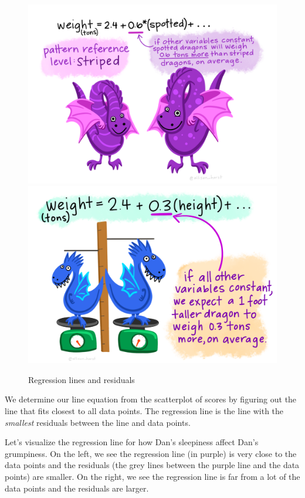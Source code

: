 \documentclass[
]{book}
\begin{document}
\begin{figure}

{\centering \includegraphics[width=0.49\linewidth]{images/13-regression/dragon_categorical} \includegraphics[width=0.49\linewidth]{images/13-regression/dragons_continuous} 

}

\caption{Regression lines and residuals}\label{fig:unnamed-chunk-1}
\end{figure}

We determine our line equation from the scatterplot of scores by figuring out the line that fits closest to all data points. The regression line is the line with the \emph{smallest} residuals between the line and data points.

Let's visualize the regression line for how Dan's sleepiness affect Dan's grumpiness. On the left, we see the regression line (in purple) is very close to the data points and the residuals (the grey lines between the purple line and the data points) are smaller. On the right, we see the regression line is far from a lot of the data points and the residuals are larger.
\end{document}
